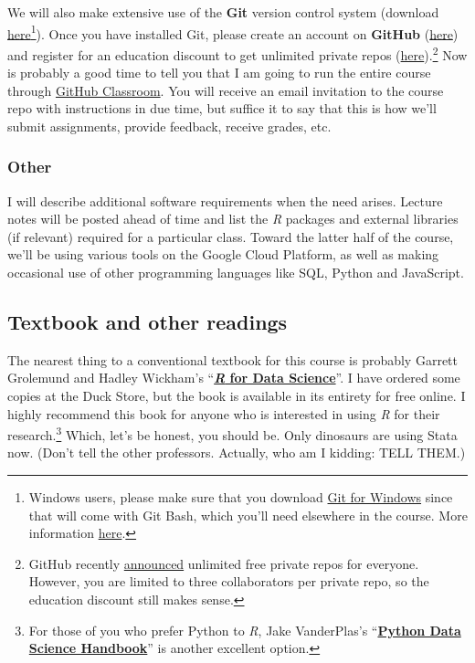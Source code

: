 \documentclass[12]{article}
\begin{document}
We will also make extensive use of the \textbf{Git} version control system (download \href{https://git-scm.com/downloads}{here}\footnote{Windows users, please make sure that you download \href{https://gitforwindows.org/}{Git for Windows} since that will come with Git Bash, which you'll need elsewhere in the course. More information \href{http://happygitwithr.com/install-git.html\#install-git-windows}{here}.}). Once you have installed Git, please create an account on \textbf{GitHub} (\href{https://github.com/join}{here}) and register for an education discount to get unlimited private repos (\href{https://education.github.com/discount_requests/new}{here}).\footnote{GitHub recently \href{https://blog.github.com/changelog/2019-01-08-pricing-changes/}{announced} unlimited free private repos for everyone. However, you are limited to three collaborators per private repo, so the education discount still makes sense.} Now is probably a good time to tell you that I am going to run the entire course through \href{https://classroom.github.com/}{GitHub Classroom}. You will receive an email invitation to the course repo with instructions in due time, but suffice it to say that this is how we'll submit assignments, provide feedback, receive grades, etc.

\vspace{-0.25cm}
\subsubsection*{Other}

I will describe additional software requirements when the need arises. Lecture notes will be posted ahead of time and list the \textit{R} packages and external libraries (if relevant) required for a particular class. Toward the latter half of the course, we'll be using various tools on the Google Cloud Platform, as well as making occasional use of other programming languages like SQL, Python and JavaScript.

\subsection*{Textbook and other readings}

The nearest thing to a conventional textbook for this course is probably Garrett Grolemund and Hadley Wickham's ``\href{http://r4ds.had.co.nz}{\textbf{\textit{R} for Data Science}}''. I have ordered some copies at the Duck Store, but the book is available in its entirety for free online. I highly recommend this book for anyone who is interested in using \textit{R} for their research.\footnote{For those of you who prefer Python to \textit{R}, Jake VanderPlas's ``\href{https://jakevdp.github.io/PythonDataScienceHandbook/}{\textbf{Python Data Science Handbook}}'' is another excellent option.} Which, let's be honest, you should be. Only dinosaurs are using Stata now. (Don't tell the other professors. Actually, who am I kidding: TELL THEM.)
\end{document}
